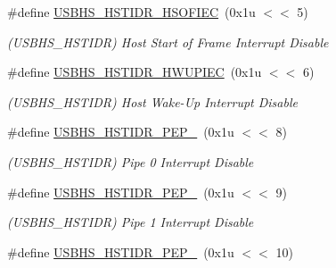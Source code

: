 \begin{DoxyCompactItemize}
\mbox{\label{group__SAMV71__USBHS_gafe37ad9df8dcc435346c4a9dd26c8276}} 
\#define \mbox{\hyperlink{group__SAMV71__USBHS_gafe37ad9df8dcc435346c4a9dd26c8276}{U\+S\+B\+H\+S\+\_\+\+H\+S\+T\+I\+D\+R\+\_\+\+H\+S\+O\+F\+I\+EC}}~(0x1u $<$$<$ 5)
\begin{DoxyCompactList}\small\item\em (U\+S\+B\+H\+S\+\_\+\+H\+S\+T\+I\+DR) Host Start of Frame Interrupt Disable \end{DoxyCompactList}\item 
\mbox{\label{group__SAMV71__USBHS_gad76e639effe266e8ea166bc9c5faf889}} 
\#define \mbox{\hyperlink{group__SAMV71__USBHS_gad76e639effe266e8ea166bc9c5faf889}{U\+S\+B\+H\+S\+\_\+\+H\+S\+T\+I\+D\+R\+\_\+\+H\+W\+U\+P\+I\+EC}}~(0x1u $<$$<$ 6)
\begin{DoxyCompactList}\small\item\em (U\+S\+B\+H\+S\+\_\+\+H\+S\+T\+I\+DR) Host Wake-\/\+Up Interrupt Disable \end{DoxyCompactList}\item 
\mbox{\label{group__SAMV71__USBHS_gadb27e9e72459e863c26266f9f79b7df1}} 
\#define \mbox{\hyperlink{group__SAMV71__USBHS_gadb27e9e72459e863c26266f9f79b7df1}{U\+S\+B\+H\+S\+\_\+\+H\+S\+T\+I\+D\+R\+\_\+\+P\+E\+P\+\_}}~(0x1u $<$$<$ 8)
\begin{DoxyCompactList}\small\item\em (U\+S\+B\+H\+S\+\_\+\+H\+S\+T\+I\+DR) Pipe 0 Interrupt Disable \end{DoxyCompactList}\item 
\mbox{\label{group__SAMV71__USBHS_ga7bb1a54b0b9a25a26524177876943ea8}} 
\#define \mbox{\hyperlink{group__SAMV71__USBHS_ga7bb1a54b0b9a25a26524177876943ea8}{U\+S\+B\+H\+S\+\_\+\+H\+S\+T\+I\+D\+R\+\_\+\+P\+E\+P\+\_}}~(0x1u $<$$<$ 9)
\begin{DoxyCompactList}\small\item\em (U\+S\+B\+H\+S\+\_\+\+H\+S\+T\+I\+DR) Pipe 1 Interrupt Disable \end{DoxyCompactList}\item 
\mbox{\label{group__SAMV71__USBHS_gaca8cd64c1c4800bcb2635da7e905cc5a}} 
\#define \mbox{\hyperlink{group__SAMV71__USBHS_gaca8cd64c1c4800bcb2635da7e905cc5a}{U\+S\+B\+H\+S\+\_\+\+H\+S\+T\+I\+D\+R\+\_\+\+P\+E\+P\+\_}}~(0x1u $<$$<$ 10)
$$
\end{DoxyCompactItemize}
